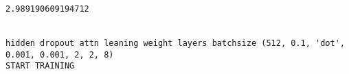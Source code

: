 \documentclass[11pt]{article}
\begin{document}
    \begin{center}
    \end{center}
    { \hspace*{\fill} \\}
    
    \begin{center}
    \end{center}
    { \hspace*{\fill} \\}
    
    \begin{Verbatim}[commandchars=\\\{\}]
2.989190609194712


hidden dropout attn leaning weight layers batchsize (512, 0.1, 'dot', 0.001, 0.001, 2, 2, 8)
START TRAINING



    \end{Verbatim}

    \begin{center}
    \end{center}
    { \hspace*{\fill} \\}
    
    \begin{center}
    \end{center}
    { \hspace*{\fill} \\}
    
    \begin{center}
    \end{center}
    { \hspace*{\fill} \\}
    
    \begin{center}
    \end{center}
    { \hspace*{\fill} \\}
    
    \begin{center}
    \end{center}
    { \hspace*{\fill} \\}
    
\end{document}
